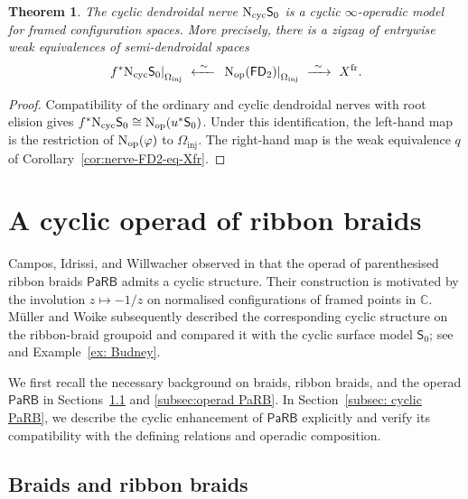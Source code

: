 \documentclass{amsart}
\newcommand{\PaRB}{\mathsf{PaRB}}
\newcommand{\nerve}{\textnormal{N}}
\newtheorem{theorem}{Theorem}[section]
\theoremstyle{definition}
\numberwithin{equation}{section}
\begin{document}
\begin{theorem}
\label{thm: cyclic infinity operad of framed configurations}
The cyclic dendroidal nerve
$\nerve_{\mathrm{cyc}}\mathsf S_0$ is a cyclic
$\infty$-operadic model for framed configuration spaces. More
precisely, there is a zigzag of entrywise weak equivalences of
semi-dendroidal spaces
\[
\left.
f^*\nerve_{\mathrm{cyc}}\mathsf S_0
\right|_{\Omega_{\mathrm{inj}}}
\ \xleftarrow{\ \sim\ }\
\left.
\nerve_{\mathrm{op}}(\mathsf{FD}_2)
\right|_{\Omega_{\mathrm{inj}}}
\ \xrightarrow{\ \sim\ }\
X^{\mathrm{fr}}.
\]
\end{theorem}

\begin{proof}
Compatibility of the ordinary and cyclic dendroidal nerves with root
elision gives
$f^*\nerve_{\mathrm{cyc}}\mathsf S_0
\cong\nerve_{\mathrm{op}}(u^*\mathsf S_0)$.
Under this identification, the left-hand map is the restriction of
$\nerve_{\mathrm{op}}(\varphi)$ to
$\Omega_{\mathrm{inj}}$. The right-hand map is the weak equivalence
$q$ of Corollary~\ref{cor:nerve-FD2-eq-Xfr}.
\end{proof}

\section{A cyclic operad of ribbon braids}
\label{sec: cyclic operad of ribbon braids}

Campos, Idrissi, and Willwacher observed in
\cite[Section~3.1]{campos2019configuration} that the operad of
parenthesised ribbon braids $\PaRB$ admits a cyclic structure. Their
construction is motivated by the involution $z\mapsto-1/z$ on
normalised configurations of framed points in $\mathbb C$. Müller and
Woike subsequently described the corresponding cyclic structure on
the ribbon-braid groupoid and compared it with the cyclic surface
model $\mathsf S_0$; see \cite[Section~5]{cyclic_ribbon} and
Example~\ref{ex: Budney}.

We first recall the necessary background on braids, ribbon braids, and
the operad $\PaRB$ in Sections~\ref{subsec: ribbon braids} and
\ref{subsec:operad PaRB}. In Section~\ref{subsec: cyclic PaRB}, we
describe the cyclic enhancement of $\PaRB$ explicitly and verify its
compatibility with the defining relations and operadic composition.

\subsection{Braids and ribbon braids}
\label{subsec: ribbon braids}
\end{document}
